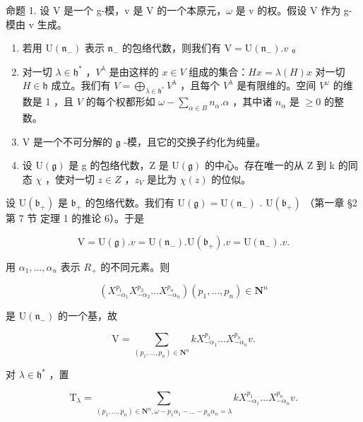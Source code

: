 命题 1. 设 V 是一个 g-模，v 是 V 的一个本原元，\(\omega\) 是 v 的权。假设 V 作为 g-模由 v 生成。

\begin{enumerate}
\def\labelenumi{(\roman{enumi})}
\item
  若用 \(\mathrm{U}(\mathfrak{n}_{-})\) 表示 \(\mathfrak{n}_{-}\) 的包络代数，则我们有 \(\mathrm{V} = \mathrm{U}(\mathfrak{n}_{-}).v\) 。
\item
  对一切 \(\lambda \in \mathfrak{h}^*\) ，\(V^{\lambda}\) 是由这样的 \(x \in V\) 组成的集合：\(Hx = \lambda(H)x\) 对一切 \(H \in \mathfrak{h}\) 成立。我们有 \(V = \bigoplus_{\lambda \in \mathfrak{h}^*} V^{\lambda}\) ，且每个 \(V^{\lambda}\) 是有限维的。空间 \(V^{\omega}\) 的维数是 1 ，且 \(V\) 的每个权都形如 \(\omega - \sum_{\alpha \in B} n_{\alpha}. \alpha\) ，其中诸 \(n_{\alpha}\) 是 \(\geq 0\) 的整数。
\item
  V 是一个不可分解的 \(\mathfrak{g}\) -模，且它的交换子约化为纯量。
\item
  设 \(\mathrm{U}(\mathfrak{g})\) 是 g 的包络代数，Z 是 \(\mathrm{U}(\mathfrak{g})\) 的中心。存在唯一的从 Z 到 k 的同态 \(\chi\) ，使对一切 \(z \in Z\) ，\(z_{V}\) 是比为 \(\chi(z)\) 的位似。
\end{enumerate}

设 \(\mathrm{U}(\mathfrak{b}_{+})\) 是 \(\mathfrak{b}_{+}\) 的包络代数。我们有 \(\mathrm{U}(\mathfrak{g}) = \mathrm{U}(\mathfrak{n}_{-})\) . \(\mathrm{U}(\mathfrak{b}_{+})\) （第一章 §2 第 7 节 定理 1 的推论 6）。于是

\[
\mathrm{V} = \mathrm{U} (\mathfrak {g}). v = \mathrm{U} (\mathfrak {n} _ {-}). \mathrm{U} (\mathfrak {b} _ {+}). v = \mathrm{U} (\mathfrak {n} _ {-}). v.
\]

用 \(\alpha_{1},\ldots,\alpha_{n}\) 表示 \(R_{+}\) 的不同元素。则

\[
\left(X _ {- \alpha_ {1}} ^ {p _ {1}} X _ {- \alpha_ {2}} ^ {p _ {2}} \dots X _ {- \alpha_ {n}} ^ {p _ {n}}\right) (p _ {1}, \ldots , p _ {n}) \in \mathbf {N} ^ {n}
\]

是 \(\mathrm{U}(\mathfrak{n}_{-})\) 的一个基，故

\[
\mathrm{V} = \sum_ {(p _ {1}, \dots , p _ {n}) \in \mathbf {N} ^ {n}} k X _ {- \alpha_ {1}} ^ {p _ {1}} \dots X _ {- \alpha_ {n}} ^ {p _ {n}} v.\tag{1}
\]

对 \(\lambda \in \mathfrak{h}^*\) ，置

\[
\mathrm{T} _ {\lambda} = \sum_ {(p _ {1}, \ldots , p _ {n}) \in \mathbf {N} ^ {n}, \omega - p _ {1} \alpha_ {1} - \dots - p _ {n} \alpha_ {n} = \lambda} k X _ {- \alpha_ {1}} ^ {p _ {1}} \ldots X _ {- \alpha_ {n}} ^ {p _ {n}} v.
\]

